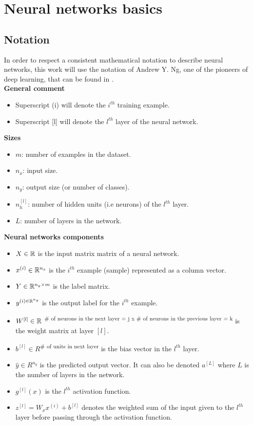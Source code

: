 \section{Neural networks basics}

\subsection{Notation}
In order to respect a consistent mathematical notation to describe neural networks, this work will use the notation of Andrew Y. Ng, one of the pioneers of deep learning, that can be found in \cite{16}.\\

\noindent \textbf{General comment}
\begin{itemize}
\item Superscript (i) will denote the $i^{th}$ training example.
\item Superscript [l] will denote the $l^{th}$ layer of the neural network.
\end{itemize}

\noindent \textbf{Sizes}
\begin{itemize}
\item $m$: number of examples in the dataset.
\item $n_{x}$: input size.
\item $n_{y}$: output size (or number of classes).
\item $n_{h}^{[l]}$: number of hidden units (i.e neurons) of the $l^{th}$ layer. 
\item $L$: number of layers in the network.
\end{itemize}

\noindent \textbf{Neural networks components}
\begin{itemize}
\item $X\in \mathbb{R}$ is the input matrix matrix of a neural network.
\item $x^{(i)} \in \mathbb{R}^{n_{x}}$ is the $i^{th}$ example (sample) represented as a column vector.
\item $Y \in \mathbb{R}^{n_{y} \times m}$ is the label matrix.
\item $y^{(i) \in \mathbb{R}^{n_{y}}}$ is the output label for the $i^{th}$ example.
\item $W^{[l]} \in \mathbb{R}$ \textsuperscript{\# of neurons in the next layer = j  x \# of neurons in the previous layer = k} is the weight matrix at layer $[l]$.
\item $b^{[l]} \in R$\textsuperscript{\# of units in next layer} is the bias vector in the $l^{th}$ layer.
\item $\hat{y} \in R^{n_{y}}$ is the predicted output vector. It can also be denoted $a^{[L]}$ where $L$ is the number of layers in the network.
\item $g^{[l]}(x)$ is the $l^{th}$ activation function.  
\item $z^{[l]} = W_{x}x^{(i)} + b^{[l]}$ denotes the weighted sum of the input given to the $l^{th}$ layer before passing through the activation function.\\
\end{itemize}

